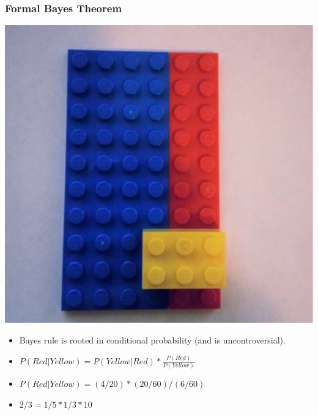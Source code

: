 \documentclass[hyperref={pdfpagelabels=false},unknownkeysallowed]{beamer}
\begin{document}

\begin{frame}
\frametitle{Formal Bayes Theorem}
\begin{center}
\includegraphics[scale=0.2]{Lego.pdf} 
\end{center}
\begin{itemize}
\item Bayes rule is rooted in conditional probability (and is uncontroversial).
\item $P(Red|Yellow) = P(Yellow|Red) * \frac{P(Red)}{P(Yellow)}$
\item $P(Red|Yellow) = (4/20) * (20/60) / (6/60)$
\item $2 / 3 = 1/5 * 1/3 * 10$
\end{itemize} 
\end{frame}
\end{document}
